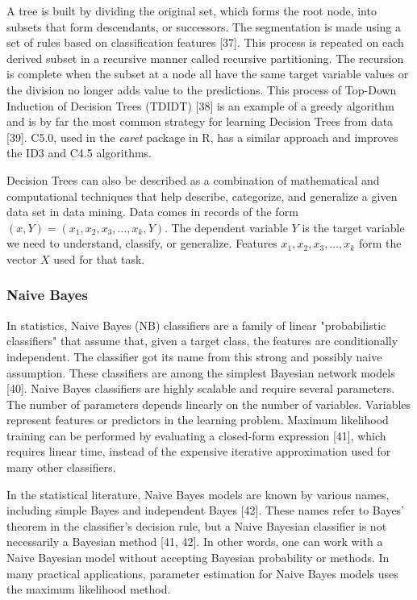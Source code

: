\documentclass[sn-mathphys-num]{sn-jnl}%
\begin{document}
A tree is built by dividing the original set, which forms the root node, into subsets that form descendants, or successors. The segmentation is made using a set of rules based on classification features [37]. This process is repeated on each derived subset in a recursive manner called recursive partitioning. The recursion is complete when the subset at a node all have the same target variable values or the division no longer adds value to the predictions. This process of Top-Down Induction of Decision Trees (TDIDT) [38] is an example of a greedy algorithm and is by far the most common strategy for learning Decision Trees from data [39]. C5.0, used in the \textit{caret} package in R, has a similar approach and improves the ID3 and C4.5 algorithms.

Decision Trees can also be described as a combination of mathematical and computational techniques that help describe, categorize, and generalize a given data set in data mining. Data comes in records of the form $(x, Y) = (x_{1}, x_{2}, x_{3}, \ldots, x_{k}, Y)$. The dependent variable $Y$ is the target variable we need to understand, classify, or generalize. Features $x_{1}, x_{2}, x_{3}, \ldots, x_{k}$ form the vector $X$ used for that task.

\subsubsection{Naive Bayes}

In statistics, Naive Bayes (NB) classifiers are a family of linear "probabilistic classifiers" that assume that, given a target class, the features are conditionally independent. The classifier got its name from this strong and possibly naive assumption. These classifiers are among the simplest Bayesian network models [40]. Naive Bayes classifiers are highly scalable and require several parameters. The number of parameters depends linearly on the number of variables. Variables represent features or predictors in the learning problem. Maximum likelihood training can be performed by evaluating a closed-form expression [41], which requires linear time, instead of the expensive iterative approximation used for many other classifiers.

In the statistical literature, Naive Bayes models are known by various names, including simple Bayes and independent Bayes [42]. These names refer to Bayes' theorem in the classifier's decision rule, but a Naive Bayesian classifier is not necessarily a Bayesian method [41, 42]. In other words, one can work with a Naive Bayesian model without accepting Bayesian probability or methods. In many practical applications, parameter estimation for Naive Bayes models uses the maximum likelihood method.
\end{document}

